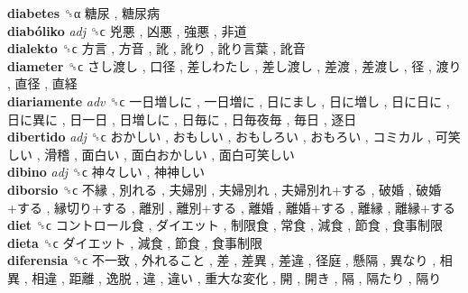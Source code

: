 \textbf{diabetes} ␝α   糖尿 ,  糖尿病   \\
\textbf{diabóliko} \emph{adj}  ␝ϲ   兇悪 ,  凶悪 ,  強悪 ,  非道   \\
\textbf{dialekto} ␝ϲ   方言 ,  方音 ,  訛 ,  訛り ,  訛り言葉 ,  訛音   \\
\textbf{diameter} ␝ϲ   さし渡し ,  口径 ,  差しわたし ,  差し渡し ,  差渡 ,  差渡し ,  径 ,  渡り ,  直径 ,  直経   \\
\textbf{diariamente} \emph{adv}  ␝ϲ   一日増しに ,  一日増に ,  日にまし ,  日に増し ,  日に日に ,  日に異に ,  日一日 ,  日増しに ,  日毎に ,  日毎夜毎 ,  毎日 ,  逐日   \\
\textbf{dibertido} \emph{adj}  ␝ϲ   おかしい ,  おもしい ,  おもしろい ,  おもろい ,  コミカル ,  可笑しい ,  滑稽 ,  面白い ,  面白おかしい ,  面白可笑しい   \\
\textbf{dibino} \emph{adj}  ␝ϲ   神々しい ,  神神しい   \\
\textbf{diborsio} ␝ϲ   不縁 ,  別れる ,  夫婦別 ,  夫婦別れ ,  夫婦別れ+する ,  破婚 ,  破婚+する ,  縁切り+する ,  離別 ,  離別+する ,  離婚 ,  離婚+する ,  離縁 ,  離縁+する   \\
\textbf{diet} ␝ϲ   コントロール食 ,  ダイエット ,  制限食 ,  常食 ,  減食 ,  節食 ,  食事制限   \\
\textbf{dieta} ␝ϲ   ダイエット ,  減食 ,  節食 ,  食事制限   \\
\textbf{diferensia} ␝ϲ   不一致 ,  外れること ,  差 ,  差異 ,  差違 ,  径庭 ,  懸隔 ,  異なり ,  相異 ,  相違 ,  距離 ,  逸脱 ,  違 ,  違い ,  重大な変化 ,  開 ,  開き ,  隔 ,  隔たり ,  隔り   \\
